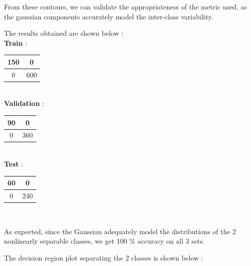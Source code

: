 \documentclass{article}
\begin{document}
\begin{flushleft}

From these contours, we can validate the appropriateness of the metric used, as the gaussian components accurately model the inter-class variability.

The results obtained are shown below : \\[10pt]

\textbf{Train} : \\[10pt]

\begin{tabular}{|c|c|}  \hline 150 & 0\\ \hline 0 & 600 \\ \hline \end{tabular} \\[10pt]

\textbf{Validation} : \\[10pt]

\begin{tabular}{|c|c|} \hline 90 & 0\\ \hline 0 & 360 \\ \hline \end{tabular} \\[10pt]


\textbf{Test} : \\[10pt]
\begin{tabular}{|c|c|}  \hline 60  & 0\\ \hline 0 & 240 \\ \hline \end{tabular} \\[10pt]

\begin{flushleft}
As expected, since the Gaussian adequately model the distributions of the 2 nonlinearly separable classes, we get 100 \% accuracy on all 3 sets.

The decision region plot separating the 2 classes is shown below :

\end{flushleft}

\end{flushleft}
\end{document}
